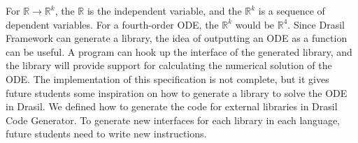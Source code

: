 For $\mathbb{R} \rightarrow \mathbb{R}^k$, the $\mathbb{R}$ is the independent variable, and the $\mathbb{R}^k$ is a sequence of dependent variables. For a fourth-order ODE, the $\mathbb{R}^k$ would be $\mathbb{R}^4$. Since Drasil Framework can generate a library, the idea of outputting an ODE as a function can be useful. A program can hook up the interface of the generated library, and the library will provide support for calculating the numerical solution of the ODE. The implementation of this specification is not complete, but it gives future students some inspiration on how to generate a library to solve the ODE in Drasil. We defined how to generate the code for external libraries in Drasil Code Generator. To generate new interfaces for each library in each language, future students need to write new instructions. 





